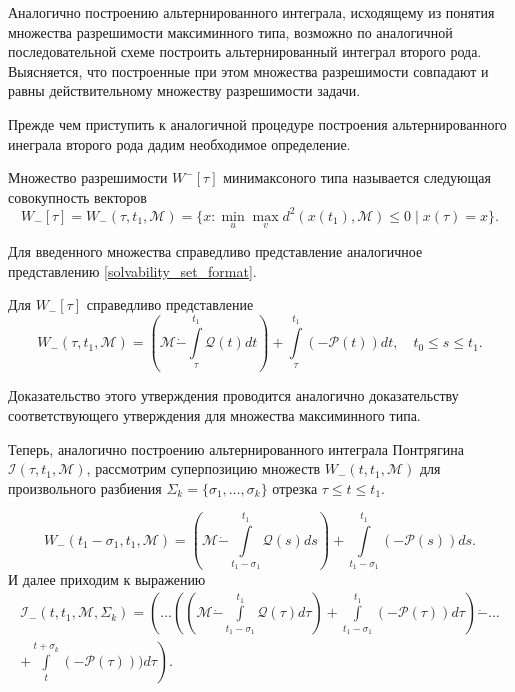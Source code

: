 Аналогично построению альтернированного интеграла, исходящему из понятия множества разрешимости
 максиминного типа, возможно по аналогичной последовательной схеме построить альтернированный
 интеграл второго рода. Выясняется, что построенные при этом множества разрешимости совпадают
 и равны действительному множеству разрешимости задачи.

Прежде чем приступить к аналогичной процедуре построения альтернированного инеграла второго рода
дадим необходимое определение.

\begin{definition}
    Множество разрешимости \( W^-[\tau] \) минимаксоного типа называется следующая совокупность
     векторов
    \begin{equation*}
        W_-[\tau] = W_-(\tau, t_1, \mathcal{M}) = \{ x : \min_u \max_v d^2(x(t_1),
         \mathcal{M}) \le 0 \mid x(\tau) = x \}.
    \end{equation*}
\end{definition}
Для введенного множества справедливо представление аналогичное представлению 
 \eqref{solvability_set_format}.
\begin{statement}
    Для \( W_-[\tau] \) справедливо представление
    \begin{equation}
        W_-(\tau, t_1, \mathcal{M}) = \left( \mathcal{M} \dot{-} \int\limits_{\tau}^{t_1}
         \mathcal{Q}(t) dt \right) + \int\limits_{\tau}^{t_1} (-\mathcal{P}(t)) dt, \quad 
         t_0 \le s \le t_1.
    \end{equation}
\end{statement}
Доказательство этого утверждения проводится аналогично доказательству соответствующего утверждения для
 множества максиминного типа.

Теперь, аналогично построению альтернированного интеграла Понтрягина \( \mathcal{I}(\tau, t_1,
 \mathcal{M}) \), рассмотрим суперпозицию множеств \( W_-(t, t_1, \mathcal{M}) \) для произвольного
 разбиения \( \Sigma_k = \{ \sigma_1, \dots, \sigma_k\} \) отрезка \( \tau \le t \le t_1 \).

\begin{equation*}
    W_-(t_1 - \sigma_1, t_1, \mathcal{M}) = \left( \mathcal{M} \dot{-} \int\limits_{t_1 - 
     \sigma_1}^{t_1} \mathcal{Q}(s) ds \right) + \int\limits_{t_1 - \sigma_1}^{t_1} (-\mathcal{P}(s))ds.
\end{equation*}
И далее приходим к выражению
\begin{multline}\label{}
    \mathcal{I}_-(t, t_1, \mathcal{M}, \Sigma_k) = \left(\dots\left(\left(\mathcal{M} \dot{-}
     \int\limits_{t_1 - \sigma_1}^{t_1} \mathcal{Q}(\tau) d\tau \right) + \int\limits_{t_1 - 
     \sigma_1}^{t_1}(-\mathcal{P}(\tau)) d\tau \right) \dot{-} \dots \right. \\
    \left. + \int\limits_{t}^{t + \sigma_k} (-\mathcal{P}(\tau))) d\tau \right) .
\end{multline}

